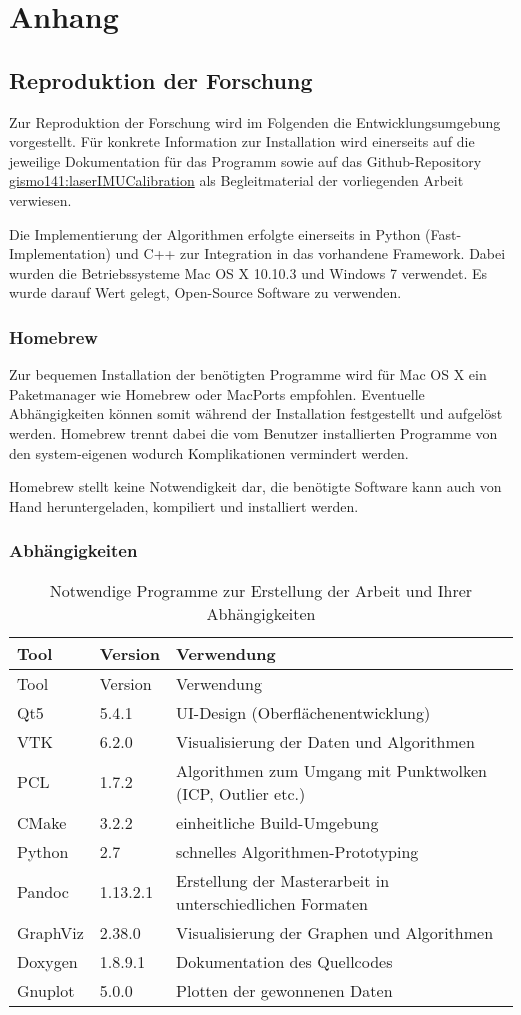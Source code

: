 \chapter{Anhang}\label{anhang}

\section{Reproduktion der Forschung}\label{reproduktion-der-forschung}

Zur Reproduktion der Forschung wird im Folgenden die
Entwicklungsumgebung vorgestellt. Für konkrete Information zur
Installation wird einerseits auf die jeweilige Dokumentation für das
Programm sowie auf das Github-Repository
\href{www.github.com/gismo141/laserIMUCalibration}{gismo141:laserIMUCalibration}
als Begleitmaterial der vorliegenden Arbeit verwiesen.

Die Implementierung der Algorithmen erfolgte einerseits in Python
(Fast-Implementation) und C++ zur Integration in das vorhandene
Framework. Dabei wurden die Betriebssysteme Mac OS X 10.10.3 und Windows
7 verwendet. Es wurde darauf Wert gelegt, Open-Source Software zu
verwenden.

\subsection{Homebrew}\label{homebrew}

Zur bequemen Installation der benötigten Programme wird für Mac OS X ein
Paketmanager wie Homebrew oder MacPorts empfohlen. Eventuelle
Abhängigkeiten können somit während der Installation festgestellt und
aufgelöst werden. Homebrew trennt dabei die vom Benutzer installierten
Programme von den system-eigenen wodurch Komplikationen vermindert
werden.

Homebrew stellt keine Notwendigkeit dar, die benötigte Software kann
auch von Hand heruntergeladen, kompiliert und installiert werden.

\subsection{Abhängigkeiten}\label{abhuxe4ngigkeiten}

\begin{longtable}[c]{@{}lll@{}}
\caption{Notwendige Programme zur Erstellung der Arbeit und Ihrer
Abhängigkeiten}\tabularnewline
\toprule
Tool & Version & Verwendung\tabularnewline
\midrule
\endfirsthead
\toprule
Tool & Version & Verwendung\tabularnewline
\midrule
\endhead
Qt5 & 5.4.1 & UI-Design (Oberflächenentwicklung)\tabularnewline
VTK & 6.2.0 & Visualisierung der Daten und Algorithmen\tabularnewline
PCL & 1.7.2 & Algorithmen zum Umgang mit Punktwolken (ICP, Outlier
etc.)\tabularnewline
CMake & 3.2.2 & einheitliche Build-Umgebung\tabularnewline
Python & 2.7 & schnelles Algorithmen-Prototyping\tabularnewline
Pandoc & 1.13.2.1 & Erstellung der Masterarbeit in unterschiedlichen
Formaten\tabularnewline
GraphViz & 2.38.0 & Visualisierung der Graphen und
Algorithmen\tabularnewline
Doxygen & 1.8.9.1 & Dokumentation des Quellcodes\tabularnewline
Gnuplot & 5.0.0 & Plotten der gewonnenen Daten\tabularnewline
\bottomrule
\end{longtable}

